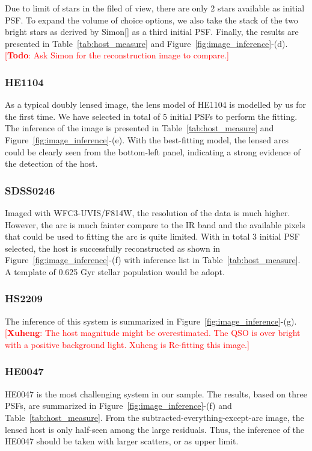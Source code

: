 \documentclass[fleqn,usenatbib]{mnras}
\newcommand{\ding}[1]{\textcolor{red}{[{\bf Xuheng}: #1]}}
\newcommand{\todo}[1]{\textcolor{red}{[{\bf Todo}: #1]}}
\begin{document}
Due to limit of stars in the filed of view, there are only 2 stars available as initial PSF. To expand the volume of choice options, we also take the stack of the two bright stars as derived by Simon[] as a third initial PSF. Finally, the results are presented in Table~\ref{tab:host_measure} and Figure~\ref{fig:image_inference}-(d).
\todo{Ask Simon for the reconstruction image to compare.}


\subsubsection{HE1104}
As a typical doubly lensed image, the lens model of HE1104 is modelled by us for the first time. We have selected in total of 5 initial PSFs to perform the fitting. The inference of the image is presented in Table~\ref{tab:host_measure} and Figure~\ref{fig:image_inference}-(e).  With the best-fitting model, the lensed arcs could be clearly seen from the bottom-left panel, indicating a strong evidence of the detection of the host.

\subsubsection{SDSS0246}
Imaged with WFC3-UVIS/F814W, the resolution of the data is much higher. However, the arc is much fainter compare to the IR band and the available pixels that could be used to fitting the arc is quite limited. With in total 3 initial PSF selected, the host is successfully reconstructed as shown in Figure~\ref{fig:image_inference}-(f) with inference list in Table~\ref{tab:host_measure}. A template of 0.625 Gyr stellar population would be adopt.

\subsubsection{HS2209}
The inference of this system is summarized in Figure~\ref{fig:image_inference}-(g). \ding{The host magnitude might be overestimated. The QSO is over bright with a positive background light. Xuheng is Re-fitting this image.}

\subsubsection{HE0047}
HE0047 is the most challenging system in our sample. The results, based on three PSFs, are summarized in Figure~\ref{fig:image_inference}-(f) and Table~\ref{tab:host_measure}. From the subtracted-everything-except-arc image, the lensed host is only half-seen among the large residuals. Thus, the inference of the HE0047 should be taken with larger scatters, or as upper limit.
\end{document}
